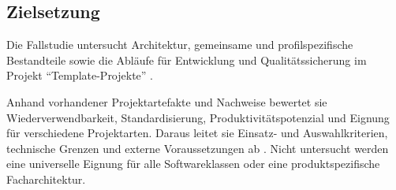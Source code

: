 \subsection{Zielsetzung}
\label{subsec:zielsetzung}

Die Fallstudie untersucht Architektur, gemeinsame und profilspezifische
Bestandteile sowie die Abläufe für Entwicklung und Qualitätssicherung im
Projekt \enquote{Template-Projekte}
\parencite{kleiveist2026architecture,kleiveist2026tooling}.

Anhand vorhandener Projektartefakte und Nachweise bewertet sie
Wiederverwendbarkeit, Standardisierung, Produktivitätspotenzial und Eignung für
verschiedene Projektarten. Daraus leitet sie Einsatz- und Auswahlkriterien,
technische Grenzen und externe Voraussetzungen ab
\parencite{kleiveist2026acceptance}. Nicht untersucht werden eine universelle
Eignung für alle Softwareklassen oder eine produktspezifische Facharchitektur.
